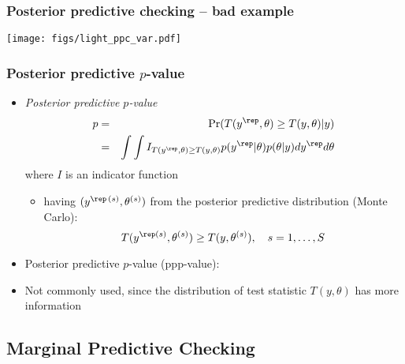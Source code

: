 \documentclass[10pt]{beamer}
\begin{document}
\begin{frame}[fragile]

\frametitle{Posterior predictive checking -- bad example}

  \texttt{[image: figs/light\_ppc\_var.pdf]}

\end{frame}


\begin{frame}[fragile]

\frametitle{Posterior predictive $p$-value}

  \begin{itemize}
  \item<1-> \textit{Posterior predictive $p$-value}
    \begin{eqnarray*}
      p & = & \Pr(T(y^{\rep},\theta)\geq T(y,\theta)|y)\\
      & = & \int\int
      I_{T(y^{\rep},\theta)\geq T(y,\theta)}p(y^{\rep}|\theta)p(\theta|y)dy^{\rep}d\theta
    \end{eqnarray*}
    where $I$ is an indicator function
    \begin{itemize}
    \item<2-> having $(y^{\rep\,(s)},\theta^{(s)})$ from the posterior predictive
      distribution (Monte Carlo):
      \begin{equation*}
        T(y^{\rep (s)},\theta^{(s)})\geq T(y,\theta^{(s)}), \quad s=1,\ldots,S
      \end{equation*}
    \end{itemize}
    \vspace{-1.5\baselineskip}
  \item<3-> Posterior predictive $p$-value (ppp-value):\\
  \item<4-> Not commonly used, since the distribution of test
    statistic $T(y,\theta)$ has more information
  \end{itemize}

\end{frame}

\subsection{Marginal Predictive Checking}
\frame{\subsectionpage}
\end{document}
